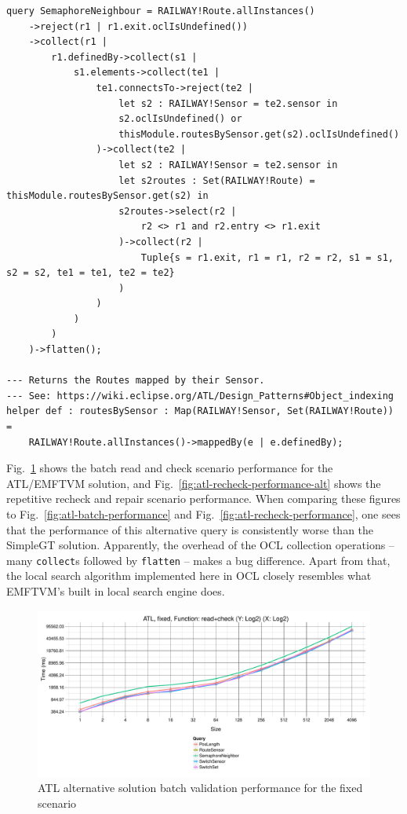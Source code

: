 \documentclass[submission,copyright,creativecommons]{eptcs}
\begin{document}
\lstset{language=atl}
\begin{lstlisting}[float=htb, caption={SemaphoreNeighbor query in ATL}, label=lst:semaphoreneighbor, captionpos=b, frame=tb, belowskip=-10pt]
query SemaphoreNeighbour = RAILWAY!Route.allInstances()
	->reject(r1 | r1.exit.oclIsUndefined())
	->collect(r1 | 
		r1.definedBy->collect(s1 | 
			s1.elements->collect(te1 | 
				te1.connectsTo->reject(te2 | 
					let s2 : RAILWAY!Sensor = te2.sensor in
					s2.oclIsUndefined() or 
					thisModule.routesBySensor.get(s2).oclIsUndefined()
				)->collect(te2 |
					let s2 : RAILWAY!Sensor = te2.sensor in
					let s2routes : Set(RAILWAY!Route) = thisModule.routesBySensor.get(s2) in
					s2routes->select(r2 |
						r2 <> r1 and r2.entry <> r1.exit
					)->collect(r2 |
						Tuple{s = r1.exit, r1 = r1, r2 = r2, s1 = s1, s2 = s2, te1 = te1, te2 = te2}
					)
				)
			)
		)
	)->flatten();

--- Returns the Routes mapped by their Sensor.
--- See: https://wiki.eclipse.org/ATL/Design_Patterns#Object_indexing
helper def : routesBySensor : Map(RAILWAY!Sensor, Set(RAILWAY!Route)) =
	RAILWAY!Route.allInstances()->mappedBy(e | e.definedBy);
\end{lstlisting}

Fig.~\ref{fig:atl-batch-performance-alt} shows the batch read and check scenario performance for the ATL/EMFTVM solution, and Fig.~\ref{fig:atl-recheck-performance-alt} shows the repetitive recheck and repair scenario performance. When comparing these figures to Fig.~\ref{fig:atl-batch-performance} and Fig.~\ref{fig:atl-recheck-performance}, one sees that the performance of this alternative query is consistently worse than the SimpleGT solution. Apparently, the overhead of the OCL collection operations -- many \texttt{collect}s followed by \texttt{flatten} -- makes a bug difference. Apart from that, the local search algorithm implemented here in OCL closely resembles what EMFTVM's built in local search engine does.

\begin{figure}[ht]
\centerline{
\includegraphics[width=15cm]{figures/fixed-ATL-GroupBy-Query-time-batch-validation-alt}}
\caption{ATL alternative solution batch validation performance for the fixed scenario}
\label{fig:atl-batch-performance-alt}
\end{figure}
\end{document}
